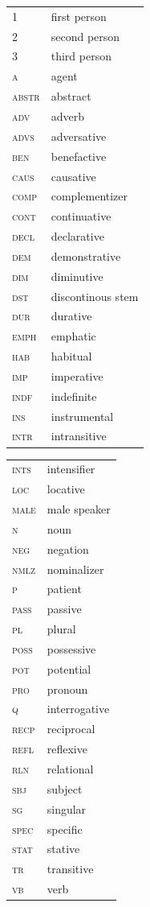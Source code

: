\documentclass[output=paper,colorlinks,citecolor=brown]{langscibook}
\begin{document}
\begin{tabularx}{.45\textwidth}{lQ}
1 & first person \\
2 & second person \\
3 & third person \\
\scshape a  & agent  \\
\scshape abstr  & abstract \\ 
\scshape adv  & adverb \\
\scshape advs  & adversative \\
\scshape ben & benefactive  \\
\scshape caus  & causative \\
\scshape comp  & complementizer \\
\scshape cont  & continuative  \\
\scshape decl  & declarative  \\
\scshape dem  & demonstrative  \\
\scshape dim  & diminutive  \\
\scshape dst & discontinous stem \\
\scshape dur  & durative  \\
\scshape emph  & emphatic  \\
\scshape hab  & habitual  \\
\scshape imp  & imperative \\
\scshape indf  & indefinite \\ 
\scshape ins  & instrumental \\
\scshape intr  & intransitive \\
\end{tabularx}
\begin{tabularx}{.45\textwidth}{lQ}
\scshape ints  & intensifier \\
\scshape loc  & locative \\
\scshape male  & male speaker \\
\scshape n  & noun \\
\scshape neg & negation \\
\scshape nmlz  & nominalizer \\
\scshape p  & patient \\
\scshape pass & passive  \\ 
\scshape pl  & plural \\
\scshape poss  & possessive  \\
\scshape pot  & potential   \\
\scshape pro  & pronoun \\
\scshape q  & interrogative  \\ 
\scshape recp  & reciprocal \\ 
\scshape refl  & reflexive \\
\scshape rln  & relational \\
\scshape sbj  & subject  \\ 
\scshape sg  & singular \\
\scshape spec  & specific  \\
\scshape stat  & stative   \\
\scshape tr  & transitive  \\
\scshape vb  & verb \\
\end{tabularx}

\printbibliography[heading=subbibliography,notkeyword=this]
\end{document}

